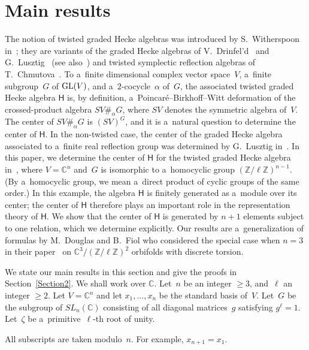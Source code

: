 \section{Main results}

The notion of twisted graded Hecke algebras was introduced by S.~Witherspoon in~\cite{W}; they are variants of the
graded Hecke algebras of V.~Drinfel'd~\cite{Dr} and G.~Lusztig~\cite{Lu2} (see also~\cite{RS}) and twisted symplectic
ref\/lection algebras of T.~Chmutova~\cite{Ch}.
To a~f\/inite dimensional complex vector space~$V$, a~f\/inite subgroup~$G$ of ${\rm GL}(V)$, and a~$2$-cocycle~$\alpha$ of~$G$,
the associated twisted graded Hecke algebra $\mathsf{H}$ is, by def\/inition, a~Poincar\'e--Birkhof\/f--Witt deformation of
the crossed-product algebra $SV\#_\alpha G$, where $SV$ denotes the symmetric algebra of~$V$.
The center of $SV\#_\alpha G$ is $(SV)^G$, and it is a~natural question to determine the center of $\mathsf{H}$.
In the non-twisted case, the center of the graded Hecke algebra associated to a~f\/inite real ref\/lection group was
determined by G.~Lusztig in~\cite[Theorem~6.5]{Lu1}.
In this paper, we determine the center of $\mathsf{H}$ for the twisted graded Hecke algebra in~\cite[Example~2.16]{W},
where $V={\mathbb{C}}^n$ and~$G$ is isomorphic to a~homocyclic group $({\mathbb{Z}}/\ell{\mathbb{Z}})^{n-1}$.
(By a~homocyclic group, we mean a~direct product of cyclic groups of the same order.) In this example, the algebra
$\mathsf{H}$ is f\/initely generated as a~module over its center; the center of $\mathsf{H}$ therefore plays an important
role in the representation theory of $\mathsf{H}$.
We show that the center of $\mathsf{H}$ is generated by $n+1$ elements subject to one relation, which we determine
explicitly.
Our results are a~generalization of formulas by M.~Douglas and B.~Fiol who considered the special case when $n=3$ in
their paper~\cite{DF} on ${\mathbb{C}}^3/({\mathbb{Z}}/\ell{\mathbb{Z}})^2$ orbifolds with discrete torsion.

We state our main results in this section and give the proofs in Section~\ref{Section2}.
We shall work over ${\mathbb{C}}$.
Let~$n$ be an integer $\ge 3$, and~$\ell$ an integer $\ge 2$.
Let $V={\mathbb{C}}^n$ and let $x_1,\ldots, x_n$ be the standard basis of~$V$.
Let~$G$ be the subgroup of $SL_n({\mathbb{C}})$ consisting of all diagonal matrices~$g$ satisfying $g^\ell =1$.
Let~$\zeta$ be a~primitive~$\ell$-th root of unity.

\begin{Notation}
All subscripts are taken modulo~$n$.
For example, $x_{n+1}=x_1$.
\end{Notation}


